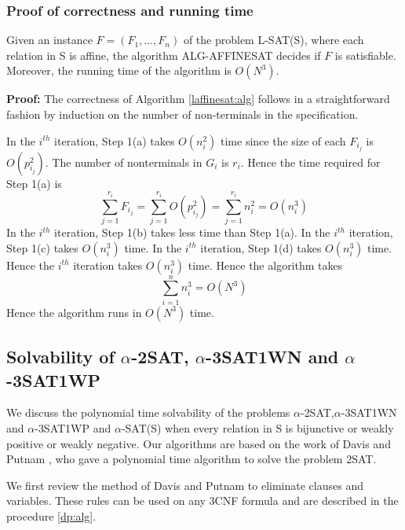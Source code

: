 \newspacing


\subsubsection{Proof of correctness and running time}

\begin{theorem}\label{th:haffineeasy}
Given an instance $F = (F_1, \ldots, F_n)$ of the problem L-SAT(S), where
each relation in S is affine, the algorithm ALG-AFFINESAT decides if $F$ is 
satisfiable. Moreover, the running time of the algorithm is $O(N^3)$.
\end{theorem}


\noindent
{\bf Proof:}
The correctness of Algorithm \ref{laffinesat:alg} 
follows in a straightforward fashion by induction on the number of 
non-terminals in the specification.

In the $i^{th}$ iteration,
Step 1(a) takes $O(n_i^2)$ time since the size of each 
$F_{i_j}$ is $O(p_{i_j}^2)$.
The number of nonterminals in $G_i$ is $r_i$. Hence the time 
required for Step 1(a) is
\[ \sum_{j=1}^{r_i} F_{i_j} = 
\sum_{j=1}^{r_i} O(p_{i_j}^2) = \sum_{j=1}^{r_i} n_i^2 = O(n_i^3)\]
In the $i^{th}$ iteration, Step 1(b) takes less time than Step 1(a).
In the $i^{th}$ iteration, Step 1(c) takes $O(n_i^3)$ time.
In the $i^{th}$ iteration, Step 1(d) takes $O(n_i^3)$ time.
Hence the $i^{th}$ iteration takes $O(n_i^3)$ time. Hence the algorithm takes
\[ \sum_{i=1}^n n_i^3 = O(N^3) \]
Hence the algorithm runs in $O(N^3)$ time.\QED




\subsection{Solvability of $\alpha$-2SAT,
$\alpha$-{\sf 3SAT1WN} and $\alpha$-{\sf 3SAT1WP}}

We discuss the polynomial time solvability of the problems 
$\alpha$-{\sf 2SAT},$\alpha$-{\sf 3SAT1WN} and $\alpha$-{\sf 3SAT1WP} 
and $\alpha$-{\sf SAT(S)} 
when every relation in {\sf S} is bijunctive or weakly positive or 
weakly negative.
Our algorithms are based on the work of Davis and Putnam \cite{DP},
who gave a polynomial time algorithm to solve the problem {\sf 2SAT}.


We first review the method of Davis and Putnam\cite{DP} to eliminate clauses
and variables. These rules can be used on any {\sf 3CNF}  formula and 
are described  in the procedure \ref{dp:alg}.

